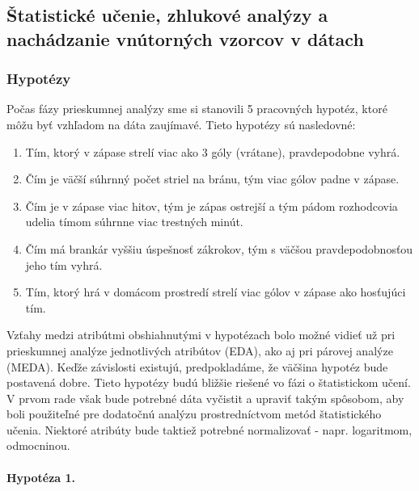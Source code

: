 \documentclass[
]{article}
\begin{document}
\hypertarget{ux161tatistickuxe9-uux10denie-zhlukovuxe9-analuxfdzy-a-nachuxe1dzanie-vnuxfatornuxfdch-vzorcov-v-duxe1tach}{%
\subsection{Štatistické učenie, zhlukové analýzy a nachádzanie
vnútorných vzorcov v
dátach}\label{ux161tatistickuxe9-uux10denie-zhlukovuxe9-analuxfdzy-a-nachuxe1dzanie-vnuxfatornuxfdch-vzorcov-v-duxe1tach}}

\hypertarget{hypotuxe9zy}{%
\subsubsection{Hypotézy}\label{hypotuxe9zy}}

Počas fázy prieskumnej analýzy sme si stanovili 5 pracovných hypotéz,
ktoré môžu byť vzhľadom na dáta zaujímavé. Tieto hypotézy sú nasledovné:

\begin{enumerate}
\def\labelenumi{\arabic{enumi}.}
\item
  Tím, ktorý v zápase strelí viac ako 3 góly (vrátane), pravdepodobne
  vyhrá.
\item
  Čím je väčší súhrnný počet striel na bránu, tým viac gólov padne v
  zápase.
\item
  Čím je v zápase viac hitov, tým je zápas ostrejší a tým pádom
  rozhodcovia udelia tímom súhrnne viac trestných minút.
\item
  Čím má brankár vyššiu úspešnosť zákrokov, tým s väčšou
  pravdepodobnosťou jeho tím vyhrá.
\item
  Tím, ktorý hrá v domácom prostredí strelí viac gólov v zápase ako
  hosťujúci tím.
\end{enumerate}

Vzťahy medzi atribútmi obshiahnutými v hypotézach bolo možné vidieť už
pri prieskumnej analýze jednotlivých atribútov (EDA), ako aj pri párovej
analýze (MEDA). Keďže závislosti existujú, predpokladáme, že väčšina
hypotéz bude postavená dobre. Tieto hypotézy budú bližšie riešené vo
fázi o štatistickom učení. V prvom rade však bude potrebné dáta vyčistit
a upraviť takým spôsobom, aby boli použiteľné pre dodatočnú analýzu
prostredníctvom metód štatistického učenia. Niektoré atribúty bude
taktiež potrebné normalizovať - napr. logaritmom, odmocninou.

\hypertarget{hypotuxe9za-1.}{%
\paragraph{Hypotéza 1.}\label{hypotuxe9za-1.}}
\end{document}
